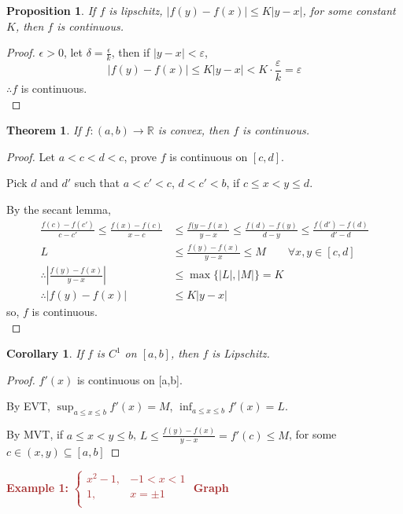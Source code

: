 \documentclass[12pt]{article}
\newcommand{\abs}[1]{\left| #1 \right|}
\theoremstyle{plain}
\newtheorem{theorem}{Theorem}[subsection]
\newtheorem{proposition}{Proposition}[subsection]
\newtheorem{corollary}{Corollary}[subsection]
\newcommand{\ep}{\varepsilon}
\begin{document}
		\begin{proposition}
			If $f$ is lipschitz, $\abs{f(y)-f(x)}\leq K\abs{y-x}$, 
			for some constant $K$, then $f$ is continuous. 
		\end{proposition}
		\begin{proof}
			$\epsilon>0$, let $\delta = \frac{\epsilon}k$, 
			then if $\abs{y-x} < \ep$,
			\[
				\abs{f(y)-f(x)} \leq K \abs{y-x} < K\cdot \frac{\ep}k= \ep
			\]
			$\therefore f$ is continuous. \\
			\end{proof}

		\begin{theorem}
			If $f:(a,b)\to\mathbb{R}$ is convex, then $f$ is continuous. 
		\end{theorem}
		\begin{proof}
			Let $a<c<d<c$, prove $f$ is continuous on $[c,d]$.

			Pick $d$ and $d'$ such that $a < c'< c$, $d<c'<b$, if $c \leq x<y\leq d$.

			By the secant lemma, 
			\begin{align*}
				\frac{f(c)-f(c')}{c-c'}\leq \frac{f(x)-f(c)}{x-c}
				&\leq\frac{f(y-f(x)}{y-x}\leq\frac{f(d)-f(y)}{d-y}
				\leq \frac{f(d')-f(d)}{d'-d}\\
				L &\leq \frac{f(y)-f(x)}{y-x}\leq M   
				\qquad \forall x,y \in [c,d]\\
				\therefore \abs{\frac{f(y)-f(x)}{y-x}}&
				\leq \max\{\abs{L},\abs{M}\}=K\\
				\therefore \abs{f(y)-f(x)}&\leq K\abs{y-x} \qquad
				\tag{lipschitz condition}
			\end{align*}
		so, $f$ is continuous. \\
	\end{proof}
			
		\begin{corollary}
			If $f$ is $C^1$ on $[a,b]$, then $f$ is Lipschitz. 
		\end{corollary}
		\begin{proof}
		  $f'(x)$ is continuous on [a,b].

		  By EVT, $\sup_{a\leq x\leq b} f'(x) = M$, 
		  $\inf_{a\leq x\leq b} f'(x) = L$.

		  By MVT, if $a\leq x<y\leq b$, 
		  $L \leq \frac{f(y)-f(x)}{y-x} = f'(c)\leq M$, 
		  for some $c \in (x,y)\subseteq [a,b]$
		\end{proof}
		
		\textcolor{Brown}{\textbf{Example 1: }
		$\begin{cases}
				x^2-1, &-1<x<1\\
				1, &x=\pm1\\
		\end{cases}$
	\textbf{Graph}}\\\\
\end{document}
